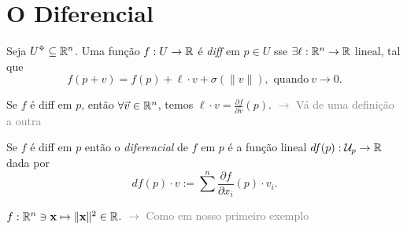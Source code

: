 \section{O Diferencial} 

\begin{definition}
    Seja \(U\ab\subseteq \R^n\). Uma função \(f:U \to \mathbb{R}\) é \emph{diff} em \(p\in U \) sse \(\exists \ell : \mathbb{R}^n \to \mathbb{R}\) lineal, tal que 
    \[f(p+v) = f(p) + \ell\cdot v + \sigma(\|v\|), \text{ \ quando} \ v\to 0. \]
\end{definition}
\vspace{-0.4cm}
\begin{lemma}
    Se \(f\) é diff em \(p\), então \(\forall \vec{v}\in \mathbb{R}^n\), temos \( \ell \cdot v =\frac{\partial f }{\partial v}(p)\). \textcolor{gray}{\(\rightarrow \) Vá de uma definição a outra} %

\end{lemma}
\begin{definition}
    Se \(f\) é diff em \(p\) então o \emph{diferencial} de \(f\) em \(p\) é a função lineal \(df(p):\mathcal{U}_p\to \mathbb{R}\) dada por 
    \[df(p)\cdot v := \sum^n \frac{\partial f}{\partial x_i}(p)\cdot v_i.\]
\end{definition} %
\begin{example}
    \(f: \mathbb{R}^n \ni \textbf{x} \mapsto \|\textbf{x}\|^2 \in \mathbb{R}\). \textcolor{gray}{\(\rightarrow\) Como em nosso primeiro exemplo}
\end{example}


